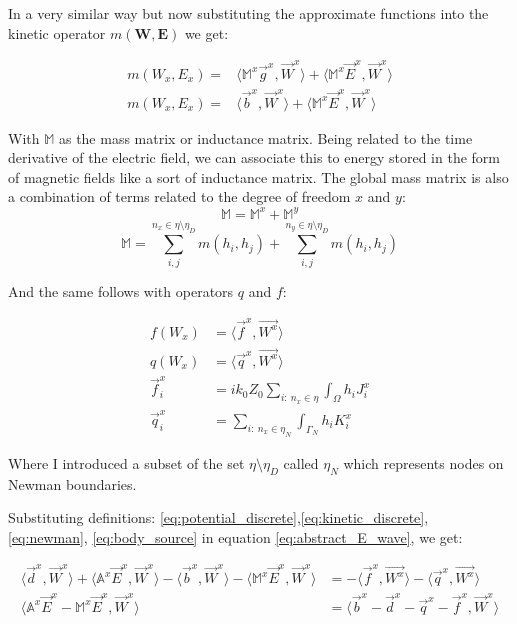 In a very similar way but now substituting the approximate functions into the kinetic operator $m(\mathbf{W},\mathbf{E})$ we get:

\begin{align}
m\left(W_x,E_x\right)=&\langle \mathbb{M}^x\vec{g}^x,\vec{W}^x\rangle
+\langle\mathbb{M}^x\vec{E}^x,\vec{W}^x\rangle\nonumber \\
m\left(W_x,E_x\right)=&\langle \vec{b}^x,\vec{W}^x\rangle
+\langle\mathbb{M}^x\vec{E}^x,\vec{W}^x\rangle \label{eq:kinetic_discrete}
\end{align}

With $\mathbb{M}$ as the mass matrix or inductance matrix. Being related to the time derivative of the electric field, we can associate this to energy stored in the form of magnetic fields like a sort of inductance matrix. The global mass matrix is also a combination of terms related to the degree of freedom $x$ and $y$: $$\mathbb{M}=\mathbb{M}^x+\mathbb{M}^y$$$$\mathbb{M} = \sum_{i,j}^{n_x \in \eta\setminus\eta_D} m(h_i,h_j)+\sum_{i,j}^{n_y \in \eta\setminus\eta_D} m(h_i,h_j)$$

And the same follows with operators $q$ and $f$:

\begin{align}
f(W_x) &= \langle \vec{f}^x, \vec{W^x}\rangle \label{eq:body_source}\\
q(W_x) &= \langle \vec{q}^x, \vec{W^x}\rangle \label{eq:newman}\\
\vec{f}_i^x &= ik_0Z_0\sum_{i:\ n_x \in \eta}\int_{\Omega} h_iJ_i^x\nonumber\\
\vec{q}_i^x&= \sum_{i:\ n_x \in \eta_N}\int_{\Gamma_N} h_iK_i^x \nonumber
\end{align}

Where I introduced a subset of the set $\eta  \setminus \eta_D$ called $\eta_N$ which represents nodes on Newman boundaries.

Substituting definitions: \ref{eq:potential_discrete},\ref{eq:kinetic_discrete}, \ref{eq:newman},  \ref{eq:body_source} in equation \ref{eq:abstract_E_wave}, we get:

\begin{align}
\langle\vec{d}^x,\vec{W}^x\rangle
+\langle\mathbb{A}^x\vec{E}^x,\vec{W}^x\rangle-\langle \vec{b}^x,\vec{W}^x\rangle
-\langle\mathbb{M}^x\vec{E}^x,\vec{W}^x\rangle &= -\langle \vec{f}^x, \vec{W^x}\rangle-\langle \vec{q}^x, \vec{W^x}\rangle \nonumber\\
\langle\mathbb{A}^x\vec{E}^x- \mathbb{M}^x\vec{E}^x,\vec{W}^x \rangle &=\langle \vec{b}^x-\vec{d}^x-\vec{q}^x-\vec{f}^x , \vec{W}^x \rangle
\end{align}

